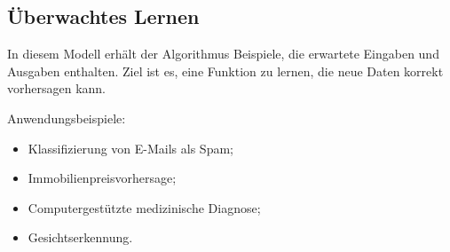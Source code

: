 \subsection{Überwachtes Lernen}

In diesem Modell erhält der Algorithmus Beispiele, die erwartete Eingaben und Ausgaben enthalten. Ziel ist es,
eine Funktion zu lernen, die neue Daten korrekt vorhersagen kann.

Anwendungsbeispiele:

\begin{itemize}
    \item Klassifizierung von E-Mails als Spam;
    \item Immobilienpreisvorhersage;
    \item Computergestützte medizinische Diagnose;
    \item Gesichtserkennung.
\end{itemize}
 